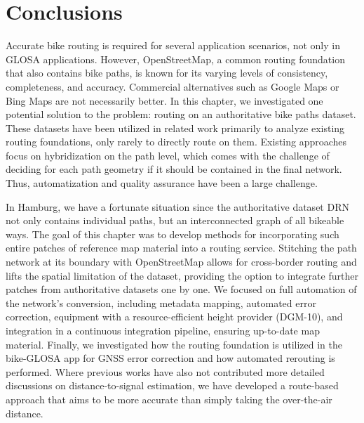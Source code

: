 \section{Conclusions}

Accurate bike routing is required for several application scenarios, not only in GLOSA applications. However, OpenStreetMap, a common routing foundation that also contains bike paths, is known for its varying levels of consistency, completeness, and accuracy. Commercial alternatives such as Google Maps or Bing Maps are not necessarily better. In this chapter, we investigated one potential solution to the problem: routing on an authoritative bike paths dataset. These datasets have been utilized in related work primarily to analyze existing routing foundations, only rarely to directly route on them. Existing approaches focus on hybridization on the path level, which comes with the challenge of deciding for each path geometry if it should be contained in the final network. Thus, automatization and quality assurance have been a large challenge. 

In Hamburg, we have a fortunate situation since the authoritative dataset DRN not only contains individual paths, but an interconnected graph of all bikeable ways. The goal of this chapter was to develop methods for incorporating such entire patches of reference map material into a routing service. Stitching the path network at its boundary with OpenStreetMap allows for cross-border routing and lifts the spatial limitation of the dataset, providing the option to integrate further patches from authoritative datasets one by one. We focused on full automation of the network's conversion, including metadata mapping, automated error correction, equipment with a resource-efficient height provider (DGM-10), and integration in a continuous integration pipeline, ensuring up-to-date map material. Finally, we investigated how the routing foundation is utilized in the bike-GLOSA app for GNSS error correction and how automated rerouting is performed. Where previous works have also not contributed more detailed discussions on distance-to-signal estimation, we have developed a route-based approach that aims to be more accurate than simply taking the over-the-air distance. 

